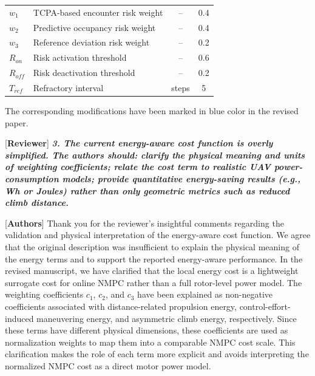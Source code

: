 \documentclass[12pt, twosides]{article}
\theoremstyle{definition}
\begin{document}
\begin{table}[h!]
{\begin{tabular}{l l c c}
			\midrule
			$w_1$ & TCPA-based encounter risk weight & -- & 0.4 \\
			$w_2$ & Predictive occupancy risk weight & -- & 0.4 \\
			$w_3$ & Reference deviation risk weight & -- & 0.2 \\
			$R_{on}$ & Risk activation threshold & -- & 0.6 \\
			$R_{off}$ & Risk deactivation threshold & -- & 0.2 \\
			$T_{ref}$ & Refractory interval & steps & 5 \\
			\bottomrule
		\end{tabular}%
	}
\end{table}

The corresponding modifications have been marked in blue color in the revised paper.

\vfill
\newpage

\medskip

\textcolor[rgb]{0.00,0.00,1.00}{[\textbf {Reviewer}]} \textit{\textbf{3. The current energy-aware cost function is overly simplified. The authors should: clarify the physical meaning and units of weighting coefficients; relate the cost term to realistic UAV power-consumption models;  provide quantitative energy-saving results (e.g., Wh or Joules) rather than only geometric metrics such as reduced climb distance.}}

\textcolor[rgb]{0.00,0.00,1.00}{[\textbf{Authors}]} Thank you for the reviewer's insightful comments regarding the validation and physical interpretation of the energy-aware cost function. We agree that the original description was insufficient to explain the physical meaning of the energy terms and to support the reported energy-aware performance. In the revised manuscript, we have clarified that the local energy cost is a lightweight surrogate cost for online NMPC rather than a full rotor-level power model. The weighting coefficients $c_1$, $c_2$, and $c_3$ have been explained as non-negative coefficients associated with distance-related propulsion energy, control-effort-induced maneuvering energy, and asymmetric climb energy, respectively. Since these terms have different physical dimensions, these coefficients are used as normalization weights to map them into a comparable NMPC cost scale. This clarification makes the role of each term more explicit and avoids interpreting the normalized NMPC cost as a direct motor power model.
\end{document}
